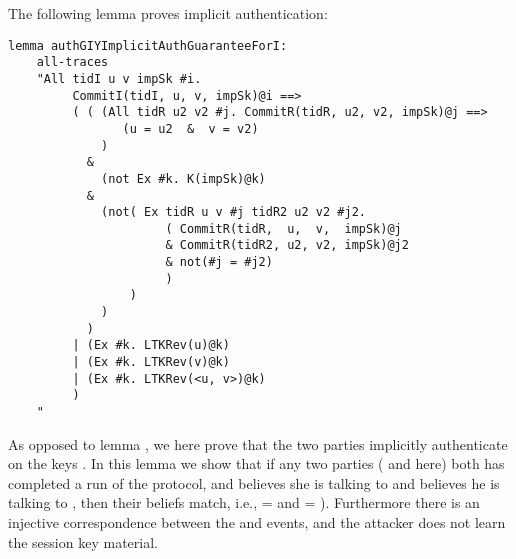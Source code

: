 The following lemma proves implicit authentication:

\begin{lstlisting}
lemma authGIYImplicitAuthGuaranteeForI:
    all-traces
    "All tidI u v impSk #i.
         CommitI(tidI, u, v, impSk)@i ==>
         ( ( (All tidR u2 v2 #j. CommitR(tidR, u2, v2, impSk)@j ==>
                (u = u2  &  v = v2)
             )
           &
             (not Ex #k. K(impSk)@k)
           &
             (not( Ex tidR u v #j tidR2 u2 v2 #j2.
                      ( CommitR(tidR,  u,  v,  impSk)@j
                      & CommitR(tidR2, u2, v2, impSk)@j2
                      & not(#j = #j2)
                      )
                 )
             )
           )
         | (Ex #k. LTKRev(u)@k)
         | (Ex #k. LTKRev(v)@k)
         | (Ex #k. LTKRev(<u, v>)@k)
         )
    "
\end{lstlisting}
As opposed to lemma , we here prove that the two
parties implicitly authenticate on the keys .
%
In this lemma we show that if any two parties ( and  here) both
has completed a run of the protocol, and  believes she is talking to
  and  believes he is talking to , then their beliefs
match, i.e.,  =  and  = ).
%
Furthermore there is an injective correspondence
between the  and  events, and the attacker does not
learn the session key material.
%
\\

